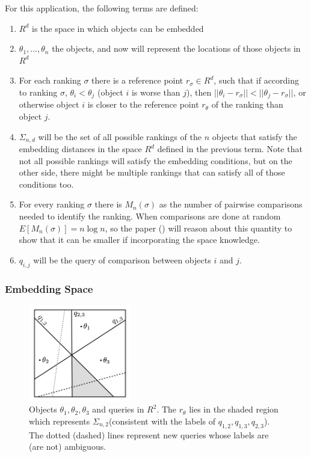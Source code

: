 \documentclass[
  letterpaper,
  DIV=11,
  numbers=noendperiod,
  oneside]{scrreprt}
\theoremstyle{remark}
\begin{document}
For this application, the following terms are defined:

\begin{enumerate}
\def\labelenumi{\arabic{enumi}.}
\item
  \(R^d\) is the space in which objects can be embedded
\item
  \(\theta_1,...,\theta_n\) the objects, and now will represent the
  locations of those objects in \(R^d\)
\item
  For each ranking \(\sigma\) there is a reference point
  \(r_{\sigma} \in R^d\), such that if according to ranking \(\sigma\),
  \(\theta_{i} < \theta_{j}\) (object \(i\) is worse than \(j\)), then
  \(||\theta_i - r_{\sigma}|| < ||\theta_j - r_{\sigma}||\), or
  otherwise object \(i\) is closer to the reference point \(r_\theta\)
  of the ranking than object \(j\).
\item
  \(\Sigma_{n,d}\) will be the set of all possible rankings of the \(n\)
  objects that satisfy the embedding distances in the space \(R^d\)
  defined in the previous term. Note that not all possible rankings will
  satisfy the embedding conditions, but on the other side, there might
  be multiple rankings that can satisfy all of those conditions too.
\item
  For every ranking \(\sigma\) there is \(M_n(\sigma)\) as the number of
  pairwise comparisons needed to identify the ranking. When comparisons
  are done at random \(E[M_n(\sigma)] = n\log n\), so the paper
  () will reason about this
  quantity to show that it can be smaller if incorporating the space
  knowledge.
\item
  \(q_{i,j}\) will be the query of comparison between objects \(i\) and
  \(j\).
\end{enumerate}

\subsubsection{Embedding Space}\label{embedding-space}

\begin{figure}

{\centering \includegraphics[width=0.4\textwidth,height=\textheight]{src/Figures/SPACE.png}

}

\caption{Objects \(\theta_1, \theta_2, \theta_3\) and queries in
\(R^2\). The \(r_\theta\) lies in the shaded region which represents
\(\Sigma_{n,2}\)(consistent with the labels of
\(q_{1,2}, q_{1,3}, q_{2,3}\)). The dotted (dashed) lines represent new
queries whose labels are (are not) ambiguous.}

\end{figure}%
\end{document}
